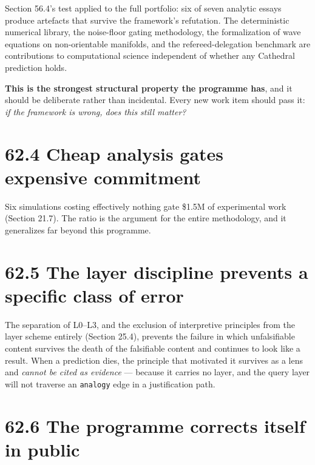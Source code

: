 \documentclass[
  11pt]{report}
\begin{document}
Section 56.4's test applied to the full portfolio: six of seven analytic
essays produce artefacts that survive the framework's refutation. The
deterministic numerical library, the noise-floor gating methodology, the
formalization of wave equations on non-orientable manifolds, and the
refereed-delegation benchmark are contributions to computational science
independent of whether any Cathedral prediction holds.

\textbf{This is the strongest structural property the programme has},
and it should be deliberate rather than incidental. Every new work item
should pass it: \emph{if the framework is wrong, does this still
matter?}

\hypertarget{cheap-analysis-gates-expensive-commitment}{%
\section{62.4 Cheap analysis gates expensive
commitment}\label{cheap-analysis-gates-expensive-commitment}}

Six simulations costing effectively nothing gate \$1.5M of experimental
work (Section 21.7). The ratio is the argument for the entire
methodology, and it generalizes far beyond this programme.

\hypertarget{the-layer-discipline-prevents-a-specific-class-of-error}{%
\section{62.5 The layer discipline prevents a specific class of
error}\label{the-layer-discipline-prevents-a-specific-class-of-error}}

The separation of L0--L3, and the exclusion of interpretive principles
from the layer scheme entirely (Section 25.4), prevents the failure in
which unfalsifiable content survives the death of the falsifiable
content and continues to look like a result. When a prediction dies, the
principle that motivated it survives as a lens and \emph{cannot be cited
as evidence} --- because it carries no layer, and the query layer will
not traverse an \texttt{analogy} edge in a justification path.

\hypertarget{the-programme-corrects-itself-in-public}{%
\section{62.6 The programme corrects itself in
public}\label{the-programme-corrects-itself-in-public}}
\end{document}
